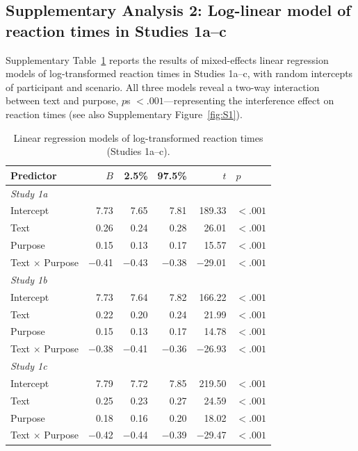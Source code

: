 \documentclass[pdflatex,sn-nature]{sn-jnl}
\begin{document}
\begin{appendices}
\clearpage

\FloatBarrier

\subsection*{Supplementary Analysis 2: Log-linear model of reaction times in Studies 1a--c}
\label{supp:analysis2}

Supplementary Table~\ref{tab:S2} reports the results of mixed-effects linear regression models of log-transformed reaction times in Studies 1a--c, with random intercepts of participant and scenario. All three models reveal a two-way interaction between text and purpose, $p$s $< .001$---representing the interference effect on reaction times (see also Supplementary Figure~\ref{fig:S1}).

\begin{table}[htbp]
\caption{Linear regression models of log-transformed reaction times (Studies 1a--c).}
\label{tab:S2}
\begin{tabular*}{\textwidth}{@{\extracolsep{\fill}}lrrrrl}
\toprule
Predictor & $B$ & 2.5\% & 97.5\% & $t$ & $p$ \\
\midrule
\multicolumn{6}{l}{\textit{Study 1a}} \\
Intercept              & 7.73  & 7.65  & 7.81  & 189.33  & $<.001$ \\
Text                   & 0.26  & 0.24  & 0.28  & 26.01   & $<.001$ \\
Purpose                & 0.15  & 0.13  & 0.17  & 15.57   & $<.001$ \\
Text $\times$ Purpose  & $-$0.41 & $-$0.43 & $-$0.38 & $-$29.01 & $<.001$ \\
\midrule
\multicolumn{6}{l}{\textit{Study 1b}} \\
Intercept              & 7.73  & 7.64  & 7.82  & 166.22  & $<.001$ \\
Text                   & 0.22  & 0.20  & 0.24  & 21.99   & $<.001$ \\
Purpose                & 0.15  & 0.13  & 0.17  & 14.78   & $<.001$ \\
Text $\times$ Purpose  & $-$0.38 & $-$0.41 & $-$0.36 & $-$26.93 & $<.001$ \\
\midrule
\multicolumn{6}{l}{\textit{Study 1c}} \\
Intercept              & 7.79  & 7.72  & 7.85  & 219.50  & $<.001$ \\
Text                   & 0.25  & 0.23  & 0.27  & 24.59   & $<.001$ \\
Purpose                & 0.18  & 0.16  & 0.20  & 18.02   & $<.001$ \\
Text $\times$ Purpose  & $-$0.42 & $-$0.44 & $-$0.39 & $-$29.47 & $<.001$ \\
\bottomrule
\end{tabular*}
\end{table}


\end{appendices}
\end{document}
